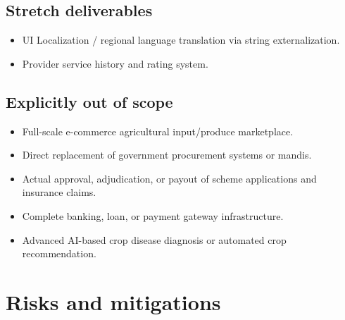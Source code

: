 \documentclass[11pt,a4paper]{article}
\begin{document}
\subsection{Stretch deliverables}
\begin{itemize}[leftmargin=*]
    \item UI Localization / regional language translation via string externalization.
    \item Provider service history and rating system.
\end{itemize}

\subsection{Explicitly out of scope}
\begin{itemize}[leftmargin=*]
    \item Full-scale e-commerce agricultural input/produce marketplace.
    \item Direct replacement of government procurement systems or mandis.
    \item Actual approval, adjudication, or payout of scheme applications and insurance claims.
    \item Complete banking, loan, or payment gateway infrastructure.
    \item Advanced AI-based crop disease diagnosis or automated crop recommendation.
\end{itemize}

\section{Risks and mitigations}
\end{document}
